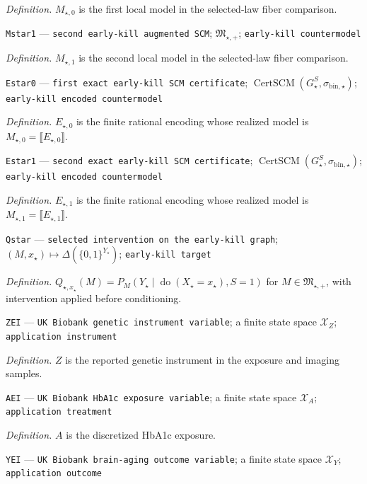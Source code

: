 \documentclass{article}
\begin{document}
\begin{itemize}
{{{{  \par\smallskip\noindent\emph{Definition.} \(M_{\star,0}\) is the first local model in the selected-law fiber comparison.
  \item \texttt{Mstar1} --- \texttt{second early-\allowbreak{}kill augmented SCM}; \(\mathfrak M_{\star,+}\); \texttt{early-\allowbreak{}kill countermodel}
  \par\smallskip\noindent\emph{Definition.} \(M_{\star,1}\) is the second local model in the selected-law fiber comparison.
  \item \texttt{Estar0} --- \texttt{first exact early-\allowbreak{}kill SCM certificate}; \(\operatorname{CertSCM}(G_\star^S,\sigma_{\mathrm{bin},\star})\); \texttt{early-\allowbreak{}kill encoded countermodel}
  \par\smallskip\noindent\emph{Definition.} \(E_{\star,0}\) is the finite rational encoding whose realized model is \(M_{\star,0}=\llbracket E_{\star,0}\rrbracket\).
  \item \texttt{Estar1} --- \texttt{second exact early-\allowbreak{}kill SCM certificate}; \(\operatorname{CertSCM}(G_\star^S,\sigma_{\mathrm{bin},\star})\); \texttt{early-\allowbreak{}kill encoded countermodel}
  \par\smallskip\noindent\emph{Definition.} \(E_{\star,1}\) is the finite rational encoding whose realized model is \(M_{\star,1}=\llbracket E_{\star,1}\rrbracket\).
  \item \texttt{Qstar} --- \texttt{selected intervention on the early-\allowbreak{}kill graph}; \((M,x_\star)\mapsto\Delta(\{0,1\}^{Y_\star})\); \texttt{early-\allowbreak{}kill target}
  \par\smallskip\noindent\emph{Definition.} \(Q_{\star,x_\star}(M)=P_M(Y_\star\mid\operatorname{do}(X_\star=x_\star),S=1)\) for \(M\in\mathfrak M_{\star,+}\), with intervention applied before conditioning.
  \item \texttt{ZEI} --- \texttt{UK Biobank genetic instrument variable}; a finite state space \(\mathcal X_Z\); \texttt{application instrument}
  \par\smallskip\noindent\emph{Definition.} \(Z\) is the reported genetic instrument in the exposure and imaging samples.
  \item \texttt{AEI} --- \texttt{UK Biobank HbA1c exposure variable}; a finite state space \(\mathcal X_A\); \texttt{application treatment}
  \par\smallskip\noindent\emph{Definition.} \(A\) is the discretized HbA1c exposure.
  \item \texttt{YEI} --- \texttt{UK Biobank brain-\allowbreak{}aging outcome variable}; a finite state space \(\mathcal X_Y\); \texttt{application outcome}
}}}}
\end{itemize}
\end{document}
